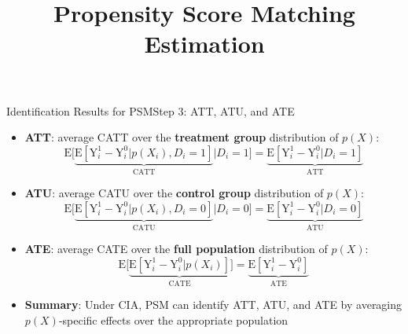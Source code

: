 \documentclass[dvipsnames,hyperref={pdfpagelabels=false}]{beamer}
\begin{document}
\begin{frame}{Identification Results for PSM}{Step 3: ATT, ATU, and ATE}
	\begin{itemize}

		\item \textbf{ATT}: average CATT over the \textbf{treatment group} distribution of $p(X)$:
		\begin{equation*}
			\mathrm{E}\Big[\underbrace{\mathrm{E}[\mathrm{Y}^{1}_{i}-\mathrm{Y}^{0}_{i}|p(X_{i}),D_i=1]}_{\text{CATT}}\Big| D_i=1\Big]
			=\underbrace{\mathrm{E}[\mathrm{Y}^{1}_{i}-\mathrm{Y}^{0}_{i}|D_i=1]}_{\text{ATT}}
		\end{equation*}

		\vspace{0.1cm}
		\item \textbf{ATU}: average CATU over the \textbf{control group} distribution of $p(X)$:
		\begin{equation*}
			\mathrm{E}\Big[\underbrace{\mathrm{E}[\mathrm{Y}^{1}_{i}-\mathrm{Y}^{0}_{i}|p(X_{i}),D_i=0]}_{\text{CATU}}\Big| D_i=0\Big]
			=\underbrace{\mathrm{E}[\mathrm{Y}^{1}_{i}-\mathrm{Y}^{0}_{i}|D_i=0]}_{\text{ATU}}
		\end{equation*}

		\vspace{0.1cm}
		\item \textbf{ATE}: average CATE over the \textbf{full population} distribution of $p(X)$:
		\begin{equation*}
			\mathrm{E}\Big[\underbrace{\mathrm{E}[\mathrm{Y}^{1}_{i}-\mathrm{Y}^{0}_{i}|p(X_{i})]}_{\text{CATE}}\Big]
			=\underbrace{\mathrm{E}[\mathrm{Y}^{1}_{i}-\mathrm{Y}^{0}_{i}]}_{\text{ATE}}
		\end{equation*}

		\vspace{0.1cm}
		\item \textbf{Summary}: Under CIA, PSM can identify ATT, ATU, and ATE by averaging $p(X)$-specific effects over the appropriate population

	\end{itemize}
\end{frame}


\title[]  
{Propensity Score Matching \\ Estimation}

\author 
{}

\institute{}

\date
{}

\begin{frame}{}
\titlepage
\end{frame}
\end{document}
